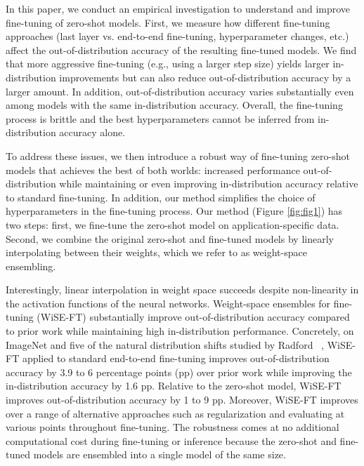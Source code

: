In this paper, we conduct an empirical investigation to understand and improve fine-tuning of zero-shot models.
First, we measure how different fine-tuning approaches (last layer vs. end-to-end fine-tuning, hyperparameter changes, etc.) affect the out-of-distribution accuracy of the resulting fine-tuned models.
We find that more aggressive fine-tuning (e.g., using a larger step size) yields larger in-distribution improvements but can also reduce out-of-distribution accuracy by a larger amount.
In addition, out-of-distribution accuracy varies substantially even among models with the same in-distribution accuracy.
Overall, the fine-tuning process is brittle and the best hyperparameters cannot be inferred from in-distribution accuracy alone.

To address these issues, we then introduce a robust way of fine-tuning zero-shot models that achieves the best of both worlds: increased performance out-of-distribution while maintaining or even improving in-distribution accuracy relative to standard fine-tuning. In addition, our method simplifies the choice of hyperparameters in the fine-tuning process.
Our method (Figure \ref{fig:fig1}) has two steps: first, we fine-tune the zero-shot model on application-specific data. Second, we combine the original zero-shot and fine-tuned models by linearly interpolating between their weights, which we refer to as weight-space ensembling. 

Interestingly, linear interpolation in weight space succeeds despite non-linearity in the activation functions of the neural networks.
Weight-space ensembles for fine-tuning (WiSE-FT) substantially improve out-of-distribution accuracy compared to prior work while maintaining high in-distribution performance.
Concretely, on ImageNet \cite{deng2009imagenet} and five of the natural distribution shifts studied by Radford \etal~\cite{radford2021learning}, WiSE-FT applied to standard end-to-end fine-tuning improves out-of-distribution accuracy by 3.9 to 6 percentage points (pp) over prior work while improving the in-distribution accuracy by 1.6 pp.
Relative to the zero-shot model, WiSE-FT improves out-of-distribution accuracy by 1 to 9 pp. Moreover, WiSE-FT improves over a range of alternative approaches such as regularization and evaluating at various points throughout fine-tuning. The robustness comes at no additional computational cost during fine-tuning or inference because the zero-shot and fine-tuned models are ensembled into a single model of the same size.

